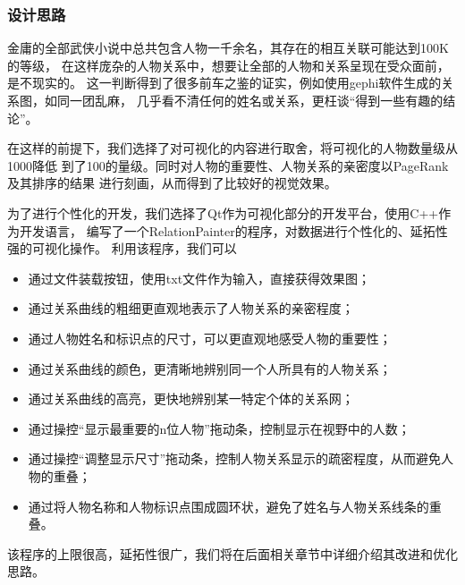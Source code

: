 \documentclass[a4paper,UTF8]{article}
\numberwithin{equation}{section}
\begin{document}
\subsubsection{设计思路}
金庸的全部武侠小说中总共包含人物一千余名，其存在的相互关联可能达到100K的等级，
在这样庞杂的人物关系中，想要让全部的人物和关系呈现在受众面前，是不现实的。
这一判断得到了很多前车之鉴的证实，例如使用gephi软件生成的关系图，如同一团乱麻，
几乎看不清任何的姓名或关系，更枉谈“得到一些有趣的结论”。
\par 在这样的前提下，我们选择了对可视化的内容进行取舍，将可视化的人物数量级从1000降低
到了100的量级。同时对人物的重要性、人物关系的亲密度以PageRank及其排序的结果
进行刻画，从而得到了比较好的视觉效果。
\par 为了进行个性化的开发，我们选择了Qt作为可视化部分的开发平台，使用C++作为开发语言，
编写了一个RelationPainter的程序，对数据进行个性化的、延拓性强的可视化操作。
利用该程序，我们可以
\begin{itemize}
    \item 通过文件装载按钮，使用txt文件作为输入，直接获得效果图；
    \item 通过关系曲线的粗细更直观地表示了人物关系的亲密程度；
    \item 通过人物姓名和标识点的尺寸，可以更直观地感受人物的重要性；
    \item 通过关系曲线的颜色，更清晰地辨别同一个人所具有的人物关系；
    \item 通过关系曲线的高亮，更快地辨别某一特定个体的关系网；
    \item 通过操控“显示最重要的n位人物”拖动条，控制显示在视野中的人数；
    \item 通过操控“调整显示尺寸”拖动条，控制人物关系显示的疏密程度，从而避免人物的重叠；
    \item 通过将人物名称和人物标识点围成圆环状，避免了姓名与人物关系线条的重叠。
\end{itemize}
该程序的上限很高，延拓性很广，我们将在后面相关章节中详细介绍其改进和优化思路。
\end{document}
